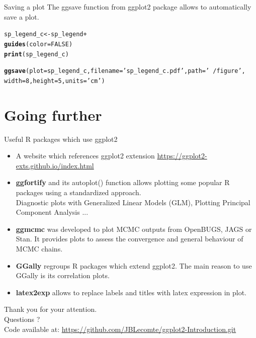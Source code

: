 \documentclass{beamer}\usepackage[]{graphicx}\usepackage[]{color}
\makeatletter
\newcommand{\hlnum}[1]{\textcolor[rgb]{0.686,0.059,0.569}{#1}}%
\newcommand{\hlstr}[1]{\textcolor[rgb]{0.192,0.494,0.8}{#1}}%
\newcommand{\hlopt}[1]{\textcolor[rgb]{0,0,0}{#1}}%
\newcommand{\hlstd}[1]{\textcolor[rgb]{0.345,0.345,0.345}{#1}}%
\newcommand{\hlkwb}[1]{\textcolor[rgb]{0.69,0.353,0.396}{#1}}%
\newcommand{\hlkwc}[1]{\textcolor[rgb]{0.333,0.667,0.333}{#1}}%
\newcommand{\hlkwd}[1]{\textcolor[rgb]{0.737,0.353,0.396}{\textbf{#1}}}%
\newenvironment{kframe}{%
 \def\at@end@of@kframe{}%
 \ifinner\ifhmode%
  \def\at@end@of@kframe{\end{minipage}}%
  \begin{minipage}{\columnwidth}%
 \fi\fi%
 \def\FrameCommand##1{\hskip\@totalleftmargin \hskip-\fboxsep
 \colorbox{shadecolor}{##1}\hskip-\fboxsep
     \hskip-\linewidth \hskip-\@totalleftmargin \hskip\columnwidth}%
 \MakeFramed {\advance\hsize-\width
   \@totalleftmargin\z@ \linewidth\hsize
   \@setminipage}}%
 {\par\unskip\endMakeFramed%
 \at@end@of@kframe}
\newenvironment{knitrout}{}{} %
\makeatother
\begin{document}
\begin{frame}[fragile]{Saving a plot}
The ggsave function from ggplot2 package allows to automatically save a plot.
\begin{knitrout}\footnotesize
{}\color{fgcolor}\begin{kframe}
\begin{alltt}
\hlstd{sp_legend_c} \hlkwb{<-} \hlstd{sp_legend} \hlopt{+}
  \hlkwd{guides}\hlstd{(}\hlkwc{color} \hlstd{=} \hlnum{FALSE}\hlstd{)}
\hlkwd{print}\hlstd{(sp_legend_c)}

\hlkwd{ggsave}\hlstd{(}\hlkwc{plot}\hlstd{=sp_legend_c,} \hlkwc{filename} \hlstd{=} \hlstr{'sp_legend_c.pdf'}\hlstd{,} \hlkwc{path} \hlstd{=} \hlstr{'~/figure'}\hlstd{,}
       \hlkwc{width} \hlstd{=} \hlnum{8}\hlstd{,} \hlkwc{height} \hlstd{=} \hlnum{5}\hlstd{,} \hlkwc{units} \hlstd{=} \hlstr{'cm'}\hlstd{)}
\end{alltt}
\end{kframe}
\end{knitrout}
\end{frame}

\section{Going further}

\begin{frame}{Useful R packages which use ggplot2}
\begin{itemize}
\item	A website which references ggplot2 extension \url{https://ggplot2-exts.github.io/index.html}

\item	\textbf{ggfortify} and its autoplot() function allows plotting some popular R packages using a standardized approach. \\
Diagnostic plots with Generalized Linear Models (GLM), Plotting Principal Component Analysis ...
\item \textbf{ggmcmc} was developed to plot MCMC outputs from OpenBUGS, JAGS or Stan. It provides plots to assess the convergence and general behaviour of MCMC chains.
\item \textbf{GGally} regroups R packages which extend ggplot2. The main reason to use GGally is its correlation plots.
\item \textbf{latex2exp} allows to replace labels and titles with latex expression in plot.
\end{itemize}
\end{frame}

\begin{frame}
\begin{center}
Thank you for your attention.\\
\vspace{0.5cm}
Questions ?\\
\vspace{0.5cm}
Code available at: \url{https://github.com/JBLecomte/ggplot2-Introduction.git}

\end{center}
\end{frame}
\end{document}
